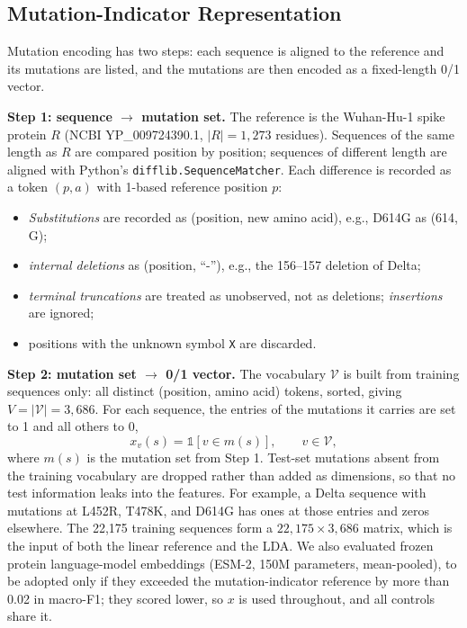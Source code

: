 \documentclass[conference]{IEEEtran}
\begin{document}
\subsection{Mutation-Indicator Representation}
\label{sec:mutations}

Mutation encoding has two steps: each sequence is aligned to the reference and its mutations are listed, and the mutations are then encoded as a fixed-length 0/1 vector.

\textbf{Step 1: sequence $\to$ mutation set.} The reference is the Wuhan-Hu-1 spike protein $R$ (NCBI YP\_009724390.1, $|R|=1{,}273$ residues). Sequences of the same length as $R$ are compared position by position; sequences of different length are aligned with Python's \texttt{difflib.SequenceMatcher}. Each difference is recorded as a token $(p,a)$ with 1-based reference position $p$:
\begin{itemize}
    \item \emph{Substitutions} are recorded as (position, new amino acid), e.g., D614G as (614, G);
    \item \emph{internal deletions} as (position, ``-''), e.g., the 156--157 deletion of Delta;
    \item \emph{terminal truncations} are treated as unobserved, not as deletions; \emph{insertions} are ignored;
    \item positions with the unknown symbol \texttt{X} are discarded.
\end{itemize}

\textbf{Step 2: mutation set $\to$ 0/1 vector.} The vocabulary $\mathcal{V}$ is built from training sequences only: all distinct (position, amino acid) tokens, sorted, giving $V=|\mathcal{V}|=3{,}686$. For each sequence, the entries of the mutations it carries are set to 1 and all others to 0,
\begin{equation}
    x_v(s)=\mathbb{1}[v\in m(s)],\qquad v\in\mathcal{V},
    \label{eq:mutation}
\end{equation}
where $m(s)$ is the mutation set from Step 1. Test-set mutations absent from the training vocabulary are dropped rather than added as dimensions, so that no test information leaks into the features. For example, a Delta sequence with mutations at L452R, T478K, and D614G has ones at those entries and zeros elsewhere. The 22,175 training sequences form a $22{,}175\times3{,}686$ matrix, which is the input of both the linear reference and the LDA. We also evaluated frozen protein language-model embeddings (ESM-2, 150M parameters, mean-pooled), to be adopted only if they exceeded the mutation-indicator reference by more than 0.02 in macro-F1; they scored lower, so $x$ is used throughout, and all controls share it.
\end{document}
